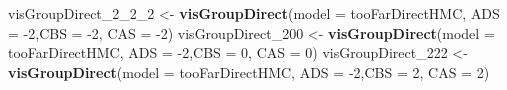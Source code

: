 \documentclass[10pt,dvipsnames,enabledeprecatedfontcommands]{scrartcl}
\newenvironment{Shaded}{\begin{snugshade}}{\end{snugshade}}
\newcommand{\KeywordTok}[1]{\textcolor[rgb]{0.13,0.29,0.53}{\textbf{#1}}}
\newcommand{\DataTypeTok}[1]{\textcolor[rgb]{0.13,0.29,0.53}{#1}}
\newcommand{\DecValTok}[1]{\textcolor[rgb]{0.00,0.00,0.81}{#1}}
\newcommand{\StringTok}[1]{\textcolor[rgb]{0.31,0.60,0.02}{#1}}
\newcommand{\NormalTok}[1]{#1}
\begin{document}
\begin{Shaded}
\begin{Highlighting}[]
\NormalTok{visGroupDirect_}\DecValTok{2}\NormalTok{_}\DecValTok{2}\NormalTok{_}\DecValTok{2}\NormalTok{ <-}\StringTok{  }\KeywordTok{visGroupDirect}\NormalTok{(}\DataTypeTok{model =}\NormalTok{ tooFarDirectHMC, }\DataTypeTok{ADS =} \DecValTok{-2}\NormalTok{,}\DataTypeTok{CBS =} \DecValTok{-2}\NormalTok{, }\DataTypeTok{CAS =} \DecValTok{-2}\NormalTok{)}
\NormalTok{visGroupDirect_}\DecValTok{200}\NormalTok{ <-}\StringTok{  }\KeywordTok{visGroupDirect}\NormalTok{(}\DataTypeTok{model =}\NormalTok{ tooFarDirectHMC, }\DataTypeTok{ADS =} \DecValTok{-2}\NormalTok{,}\DataTypeTok{CBS =} \DecValTok{0}\NormalTok{, }\DataTypeTok{CAS =} \DecValTok{0}\NormalTok{)}
\NormalTok{visGroupDirect_}\DecValTok{222}\NormalTok{ <-}\StringTok{ }\KeywordTok{visGroupDirect}\NormalTok{(}\DataTypeTok{model =}\NormalTok{ tooFarDirectHMC, }\DataTypeTok{ADS =} \DecValTok{-2}\NormalTok{,}\DataTypeTok{CBS =} \DecValTok{2}\NormalTok{, }\DataTypeTok{CAS =} \DecValTok{2}\NormalTok{)}



\end{Highlighting}
\end{Shaded}
\end{document}
